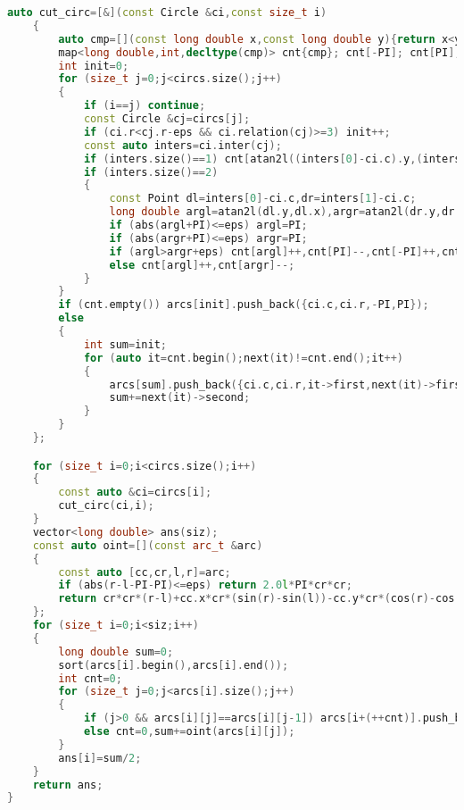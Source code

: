\documentclass[a4paper]{book}
\begin{document}
\begin{lstlisting}[language=c++]
    auto cut_circ=[&](const Circle &ci,const size_t i)
    {
        auto cmp=[](const long double x,const long double y){return x<y-eps;};
        map<long double,int,decltype(cmp)> cnt{cmp}; cnt[-PI]; cnt[PI];
        int init=0;
        for (size_t j=0;j<circs.size();j++)
        {
            if (i==j) continue;
            const Circle &cj=circs[j];
            if (ci.r<cj.r-eps && ci.relation(cj)>=3) init++;
            const auto inters=ci.inter(cj);
            if (inters.size()==1) cnt[atan2l((inters[0]-ci.c).y,(inters[0]-ci.c).x)];
            if (inters.size()==2)
            {
                const Point dl=inters[0]-ci.c,dr=inters[1]-ci.c;
                long double argl=atan2l(dl.y,dl.x),argr=atan2l(dr.y,dr.x);
                if (abs(argl+PI)<=eps) argl=PI;
                if (abs(argr+PI)<=eps) argr=PI;
                if (argl>argr+eps) cnt[argl]++,cnt[PI]--,cnt[-PI]++,cnt[argr]--,init++;
                else cnt[argl]++,cnt[argr]--;
            }
        }
        if (cnt.empty()) arcs[init].push_back({ci.c,ci.r,-PI,PI});
        else
        {
            int sum=init;
            for (auto it=cnt.begin();next(it)!=cnt.end();it++)
            {
                arcs[sum].push_back({ci.c,ci.r,it->first,next(it)->first});
                sum+=next(it)->second;
            }
        }
    };

    for (size_t i=0;i<circs.size();i++)
    {
        const auto &ci=circs[i];
        cut_circ(ci,i);
    }
    vector<long double> ans(siz);
    const auto oint=[](const arc_t &arc)
    {
        const auto [cc,cr,l,r]=arc;
        if (abs(r-l-PI-PI)<=eps) return 2.0l*PI*cr*cr;
        return cr*cr*(r-l)+cc.x*cr*(sin(r)-sin(l))-cc.y*cr*(cos(r)-cos(l));
    };
    for (size_t i=0;i<siz;i++)
    {
        long double sum=0;
        sort(arcs[i].begin(),arcs[i].end());
        int cnt=0;
        for (size_t j=0;j<arcs[i].size();j++)
        {
            if (j>0 && arcs[i][j]==arcs[i][j-1]) arcs[i+(++cnt)].push_back(arcs[i][j]);
            else cnt=0,sum+=oint(arcs[i][j]);
        }
        ans[i]=sum/2;
    }
    return ans;
}
\end{lstlisting}


\ifx\allfiles\undefined
\end{document}

